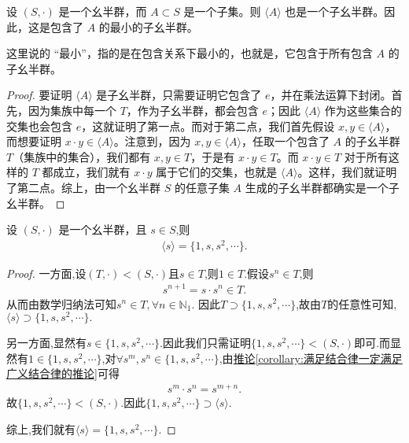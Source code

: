 \documentclass[../../main.tex]{subfiles}
\begin{document}
\begin{proposition}[由子集生成的子幺半群是包含了这个子集的最小的子幺半群]
设 $(S, \cdot)$ 是一个幺半群，而 $A \subset S$ 是一个子集。则 $\langle A \rangle$ 也是一个子幺半群。因此，这是包含了 $A$ 的最小的子幺半群。
\end{proposition}
\begin{remark}
这里说的 “最小”，指的是在包含关系下最小的，也就是，它包含于所有包含 $A$ 的子幺半群。
\end{remark}
\begin{proof}
要证明 $\langle A \rangle$ 是子幺半群，只需要证明它包含了 $e$，并在乘法运算下封闭。首先，因为集族中每一个 $T$，作为子幺半群，都会包含 $e$；因此 $\langle A \rangle$ 作为这些集合的交集也会包含 $e$，这就证明了第一点。而对于第二点，我们首先假设 $x, y \in \langle A \rangle$，而想要证明 $x \cdot y \in \langle A \rangle$。注意到，因为 $x, y \in \langle A \rangle$，任取一个包含了 $A$ 的子幺半群 $T$（集族中的集合），我们都有 $x, y \in T$，于是有 $x \cdot y \in T$。而 $x \cdot y \in T$ 对于所有这样的 $T$ 都成立，我们就有 $x \cdot y$ 属于它们的交集，也就是 $\langle A \rangle$。这样，我们就证明了第二点。综上，由一个幺半群 $S$ 的任意子集 $A$ 生成的子幺半群都确实是一个子幺半群。 
\end{proof}

\begin{proposition}\label{proposition:由单个元素生成的子幺半群的集合表示}
设 $(S, \cdot)$ 是一个幺半群，且 $s \in S$,则
\begin{align*}
\langle s\rangle =\{1,s,s^2,\cdots\}.
\end{align*} 
\end{proposition}
\begin{proof}
一方面,设$(T,\cdot)<(S,\cdot)$且$s\in T$,则$1\in T$.假设$s^n\in T$,则
\begin{align*}
s^{n+1}=s\cdot s^n\in T.
\end{align*}
从而由数学归纳法可知$s^n\in T,\forall n\in \mathbb{N}_1$.
因此$T\supset \{1,s,s^2,\cdots\}$,故由$T$的任意性可知,$\langle s\rangle\supset \{1,s,s^2,\cdots\}.$

另一方面,显然有$s\in \{1,s,s^2,\cdots\}$.因此我们只需证明$\{1,s,s^2,\cdots\}<(S,\cdot)$即可.而显然有$1\in \{1,s,s^2,\cdots\}$,对$\forall s^m,s^n\in \{1,s,s^2,\cdots\}$,由\hyperref[corollary:满足结合律一定满足广义结合律的推论]{推论\ref{corollary:满足结合律一定满足广义结合律的推论}}可得
\begin{align*}
s^m\cdot s^n=s^{m+n}.
\end{align*}
故$\{1,s,s^2,\cdots\}<(S,\cdot)$.因此$\{1,s,s^2,\cdots\}\supset \langle s\rangle.$

综上,我们就有$\langle s\rangle =\{1,s,s^2,\cdots\}.$
\end{proof}
\end{document}
